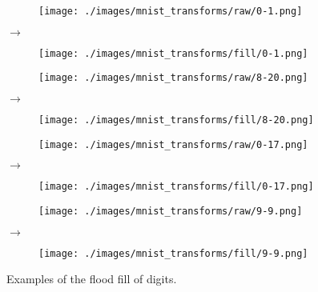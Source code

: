 \begin{figure}[H]
    \centering

    \begin{subfigure}{.15\columnwidth}
        \centering
        \texttt{[image: ./images/mnist\_transforms/raw/0-1.png]}
        \caption{}
        \label{fig:fill_orig1}
    \end{subfigure}%
    $\rightarrow$
    \begin{subfigure}{.15\columnwidth}
        \centering
        \texttt{[image: ./images/mnist\_transforms/fill/0-1.png]}
        \caption{}
        \label{fig:fill_transform1}
    \end{subfigure}

    \par\medskip

    \begin{subfigure}{.15\columnwidth}
        \centering
        \texttt{[image: ./images/mnist\_transforms/raw/8-20.png]}
        \caption{}
        \label{fig:fill_orig2}
    \end{subfigure}%
    $\rightarrow$
    \begin{subfigure}{.15\columnwidth}
        \centering
        \texttt{[image: ./images/mnist\_transforms/fill/8-20.png]}
        \caption{}
        \label{fig:fill_transform2}
    \end{subfigure}%

    \par\medskip

    \begin{subfigure}{.15\columnwidth}
        \centering
        \texttt{[image: ./images/mnist\_transforms/raw/0-17.png]}
        \caption{}
        \label{fig:fill_orig3}
    \end{subfigure}%
    $\rightarrow$
    \begin{subfigure}{.15\columnwidth}
        \centering
        \texttt{[image: ./images/mnist\_transforms/fill/0-17.png]}
        \caption{}
        \label{fig:fill_transform3}
    \end{subfigure}

    \par\medskip

    \begin{subfigure}{.15\columnwidth}
        \centering
        \texttt{[image: ./images/mnist\_transforms/raw/9-9.png]}
        \caption{}
        \label{fig:fill_orig4}
    \end{subfigure}%
    $\rightarrow$
    \begin{subfigure}{.15\columnwidth}
        \centering
        \texttt{[image: ./images/mnist\_transforms/fill/9-9.png]}
        \caption{}
        \label{fig:fill_transform4}
    \end{subfigure}

    \caption{Examples of the flood fill of digits.}
    \label{fig:fill_examples}
\end{figure}

